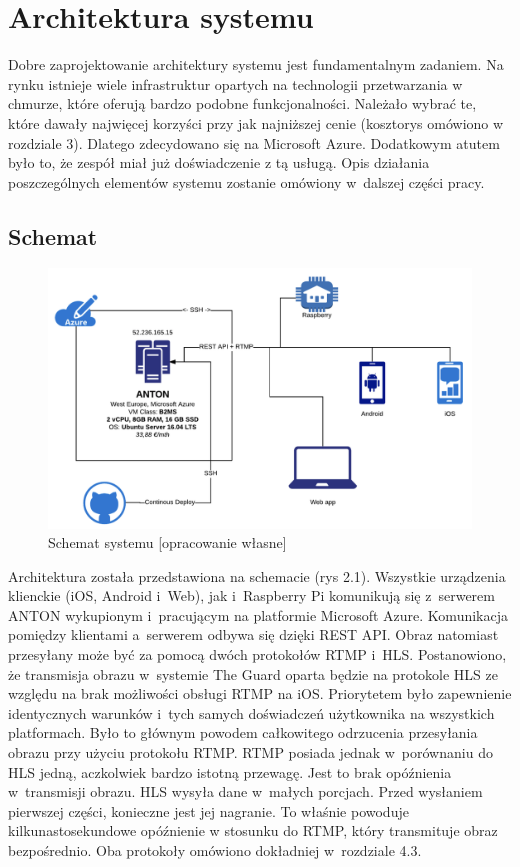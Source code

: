 \chapter{Architektura systemu}

Dobre zaprojektowanie architektury systemu jest fundamentalnym zadaniem. Na rynku istnieje wiele infrastruktur opartych na technologii przetwarzania w chmurze, które oferują bardzo podobne funkcjonalności. Należało wybrać te, które dawały najwięcej korzyści przy jak najniższej cenie (kosztorys omówiono w rozdziale 3). Dlatego zdecydowano się na Microsoft Azure. Dodatkowym atutem było to, że zespół miał już doświadczenie z tą usługą. Opis działania poszczególnych elementów systemu zostanie omówiony w~dalszej części pracy.

\section{Schemat}

\begin{figure}[ht] 
   \centering
   \includegraphics[width=12cm]{anton.png} 
   \caption{Schemat systemu [opracowanie własne]}
\end{figure}

Architektura została przedstawiona na schemacie (rys 2.1). Wszystkie urządzenia klienckie (iOS, Android i~Web), jak i~Raspberry Pi komunikują się z~serwerem ANTON wykupionym i~pracującym na platformie Microsoft Azure. Komunikacja pomiędzy klientami a~serwerem odbywa się dzięki REST API. Obraz natomiast przesyłany może być za pomocą dwóch protokołów RTMP i~HLS. Postanowiono, że transmisja obrazu w~systemie The Guard oparta będzie na protokole HLS ze względu na brak możliwości obsługi RTMP na iOS. Priorytetem było zapewnienie identycznych warunków i~tych samych doświadczeń użytkownika na wszystkich platformach. Było to głównym powodem całkowitego odrzucenia przesyłania obrazu przy użyciu protokołu RTMP. RTMP posiada jednak w~porównaniu do HLS jedną, aczkolwiek bardzo istotną przewagę. Jest to brak opóźnienia w~transmisji obrazu. HLS wysyła dane w~małych porcjach. Przed wysłaniem pierwszej części, konieczne jest jej nagranie. To właśnie powoduje kilkunastosekundowe opóźnienie w stosunku do RTMP, który transmituje obraz bezpośrednio. Oba protokoły omówiono dokładniej w~rozdziale 4.3.

